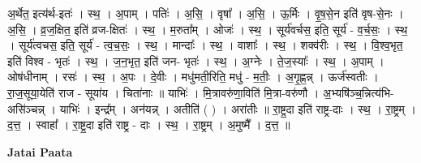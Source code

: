 \documentclass[17pt]{extarticle}
\begin{document}
अ॒र्थेत॒ इत्य॑र्थ-इतः॑ । स्थ॒ । अ॒पाम् । पतिः॑ । अ॒सि॒ । वृषा᳚ । अ॒सि॒ । ऊ॒र्मिः । वृ॒ष॒से॒न इति॑ वृष-से॒नः । अ॒सि॒ । व्र॒ज॒क्षित॒ इति॑ व्रज-क्षितः॑ । स्थ॒ । म॒रुता᳚म् । ओजः॑ । स्थ॒ । सूर्य॑वर्चस॒ इति॒ सूर्य॑ - व॒र्च॒सः॒ । स्थ॒ । सूर्य॑त्वचस॒ इति॒ सूर्य॑ - त्व॒च॒सः॒ । स्थ॒ । मान्दाः᳚ । स्थ॒ । वाशाः᳚ । स्थ॒ । शक्व॑रीः । स्थ॒ । वि॒श्व॒भृत॒ इति॑ विश्व - भृतः॑ । स्थ॒ । ज॒न॒भृत॒ इति॑ जन- भृतः॑ । स्थ॒ । अ॒ग्नेः । ते॒ज॒स्याः᳚ । स्थ॒ । अ॒पाम् । ओष॑धीनाम् । रसः॑ । स्थ॒ । अ॒पः । दे॒वीः । मधु॑मती॒रिति॒ मधु॑ - म॒तीः॒ । अ॒गृ॒ह्ण॒न्न् । ऊर्ज॑स्वतीः । रा॒ज॒सूया॒येति॑ राज - सूया॑य । चिता॑नाः ॥ याभिः॑ । मि॒त्रावरु॑णा॒विति॑ मि॒त्रा-वरु॑णौ । अ॒भ्यषि॑ञ्च॒न्नित्य॑भि-असि॑ञ्चन्न् । याभिः॑ । इन्द्र᳚म् । अन॑यन्न् । अतीति॑ ( ) । अरा॑तीः ॥ रा॒ष्ट्र॒दा इति॑ राष्ट्र-दाः । स्थ॒ । रा॒ष्ट्रम् । द॒त्त॒ । स्वाहा᳚ । रा॒ष्ट्र॒दा इति॑ राष्ट्र - दाः । स्थ॒ । रा॒ष्ट्रम् । अ॒मुष्मै᳚ । द॒त्त॒ ॥  \newline



\textbf{Jatai Paata} \newline
\end{document}
